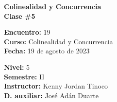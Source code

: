 \begin{center} \textbf
{
    \Large Colinealidad y Concurrencia \\ \vspace{2mm}Clase \#5
}
\end{center}

\begin{multicols}{2}
{
    \textbf{Encuentro:} 19\\
    \textbf{Curso:} Colinealidad y Concurrencia\\
    \textbf{Fecha:} 19 de agosto de 2023\\
    \begin{flushright}
        \textbf{Nivel:} 5\\
        \textbf{Semestre:} II\\
        \textbf{Instructor:} Kenny Jordan Tinoco\\
        \textbf{D. auxiliar: }José Adán Duarte
    \end{flushright}
}
\end{multicols}

\thispagestyle{first-page-style}